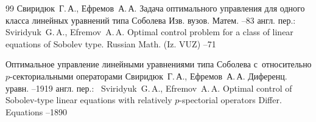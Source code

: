 \begin{thebibliography}{99}
\by Свиридюк~Г.\,А., Ефремов~А.\,А.
\paper Задача оптимального управления для одного класса линейных уравнений типа Соболева
\jour Изв. вузов. Матем.
--83
\transl англ. пер.:~
\by Sviridyuk~G.\,A., Efremov~A.\,A.
\paper Optimal control problem for a class of linear equations of Sobolev type.
\jour Russian Math. (Iz. VUZ)
--71

\paper Оптимальное управление линейными уравнениями типа Соболева с~относительно $p$-секториальными операторами
\by Свиридюк~Г.\,А., Ефремов~А.\,А.
\jour Диференц. уравн.
--1919
\transl англ. пер.:~
\by Sviridyuk~G.\,A., Efremov~A.\,A. 
\paper Optimal control of Sobolev-type linear equations with relatively $p$-spectorial operators
\jour Differ. Equations 
--1890 

\end{thebibliography}


\hskip6.5cm \thedate \par
\hskip6.5cm\therevdate\par




\makeengtitle

\renewcommand{\baselinestretch}{0.9}
\newpage


%
%
